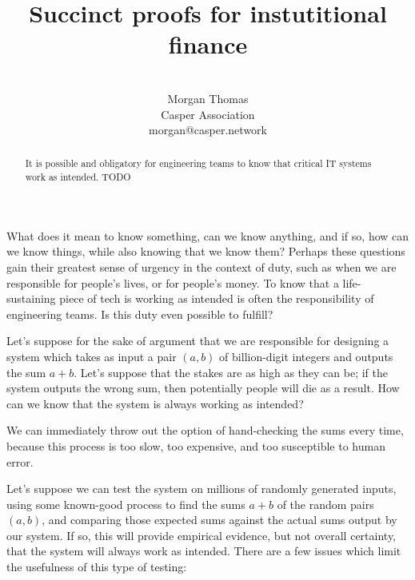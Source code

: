 \documentclass[11pt]{article}
\title{Succinct proofs for instutitional finance}
\author{ \\ Morgan Thomas \\ Casper Association \\ morgan@casper.network }
\begin{document}
\maketitle

\begin{abstract}
	It is possible and obligatory for engineering teams to know that critical
	IT systems work as intended.
	TODO
\end{abstract}

What does it mean to know something, can we know anything, and if so, how
can we know things, while also knowing that we know them? Perhaps these questions
gain their greatest sense of urgency in the context of duty, such as when we are
responsible for people's lives, or for people's money. To know that a life-sustaining
piece of tech is working as intended is often the responsibility of engineering teams.
Is this duty even possible to fulfill?

Let's suppose for the sake of argument that we are responsible for designing a system
which takes as input a pair $(a,b)$  of billion-digit integers and outputs the sum $a + b$.
Let's suppose that the stakes are as high as they can be; if the system outputs the wrong
sum, then potentially people will die as a result. How can we know that the system is always
working as intended?

We can immediately throw out the option of hand-checking the sums every time,
because this process is too slow, too expensive, and too susceptible to human error.

Let's suppose we can test the system on millions of randomly generated inputs, using
some known-good process to find the sums $a + b$ of the random pairs $(a, b)$, and
comparing those expected sums against the actual sums output by our system. If so,
this will provide empirical evidence, but not overall certainty, that the system will always
work as intended. There are a few issues which limit the usefulness of this type of testing:
\end{document}
